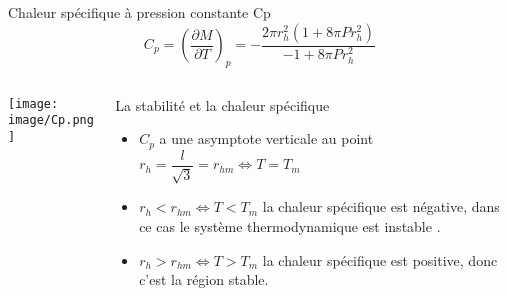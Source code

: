 \documentclass{beamer}
\begin{document}



\begin{frame}
\begin{block}{Chaleur spécifique à pression constante C{p}}
	$$C_{p}=\left( \dfrac{\partial M}{\partial T}\right) _{p}=-\dfrac{2\pi r_{h}^{2}(1+8\pi Pr_{h}^{2})}{-1+8\pi Pr_{h}^{2}}$$
\end{block}

\begin{columns}
	\begin{column}{5cm}
		\texttt{[image: image/Cp.png]}
	\end{column}
	\begin{column}{7cm}
		
		\begin{block}{La stabilité et la chaleur spécifique}
			\begin{itemize}
				\item $C_{p}$ a une asymptote verticale au point $r_{h} = \dfrac{l}{\sqrt{3}} =r_{hm} \Leftrightarrow T=T_{m}$
				\item $r_{h} < r_{hm} \Leftrightarrow  T < T_{m} $ la chaleur spécifique est négative, dans ce cas le système thermodynamique est instable .
				\item $r_{h} > r_{hm} \Leftrightarrow  T > T_{m} $ la chaleur spécifique est positive, donc c’est la région stable.
				
			\end{itemize}
		\end{block}
	\end{column}
\end{columns}
\end{frame}
\end{document}
